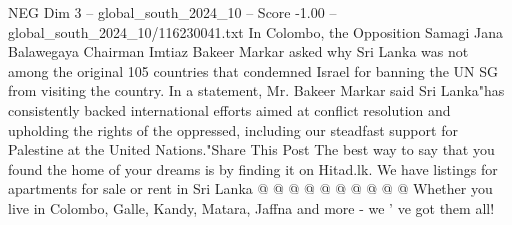 \begin{textsample}{NEG Dim 3 – global\_south\_2024\_10 – Score -1.00 – global\_south\_2024\_10/116230041.txt}
In Colombo, the Opposition Samagi Jana Balawegaya Chairman Imtiaz Bakeer Markar asked why Sri Lanka was not among the original 105 countries that condemned Israel for banning the UN SG from visiting the country.
In a statement, Mr.
Bakeer Markar said Sri Lanka"has consistently backed international efforts aimed at conflict resolution and upholding the rights of the oppressed, including our steadfast support for Palestine at the United Nations."Share This Post The best way to say that you found the home of your dreams is by finding it on Hitad.lk.
We have listings for apartments for sale or rent in Sri Lanka @ @ @ @ @ @ @ @ @ @ Whether you live in Colombo, Galle, Kandy, Matara, Jaffna and more - we ' ve got them all!

\end{textsample}
